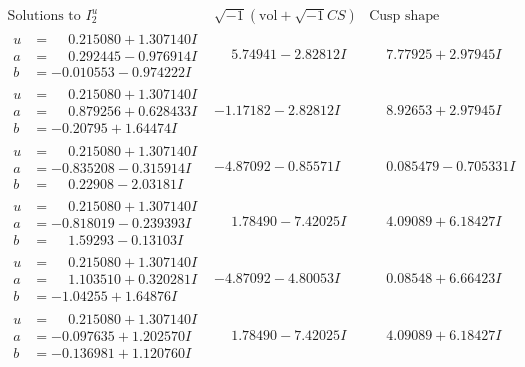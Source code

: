 \documentclass[1p]{elsarticle_modified}
\theoremstyle{definition}
\newcommand{\I}{\sqrt{-1}}
\begin{document}
$$\begin{array}{c|c|c}  
\text{Solutions to }I^u_{2}& \I (\text{vol} + \sqrt{-1}CS) & \text{Cusp shape}\\
 \hline 
\begin{aligned}
u &= \phantom{-}0.215080 + 1.307140 I \\
a &= \phantom{-}0.292445 - 0.976914 I \\
b &= -0.010553 - 0.974222 I\end{aligned}
 & \phantom{-}5.74941 - 2.82812 I & \phantom{-}7.77925 + 2.97945 I \\ \hline\begin{aligned}
u &= \phantom{-}0.215080 + 1.307140 I \\
a &= \phantom{-}0.879256 + 0.628433 I \\
b &= -0.20795 + 1.64474 I\end{aligned}
 & -1.17182 - 2.82812 I & \phantom{-}8.92653 + 2.97945 I \\ \hline\begin{aligned}
u &= \phantom{-}0.215080 + 1.307140 I \\
a &= -0.835208 - 0.315914 I \\
b &= \phantom{-}0.22908 - 2.03181 I\end{aligned}
 & -4.87092 - 0.85571 I & \phantom{-}0.085479 - 0.705331 I \\ \hline\begin{aligned}
u &= \phantom{-}0.215080 + 1.307140 I \\
a &= -0.818019 - 0.239393 I \\
b &= \phantom{-}1.59293 - 0.13103 I\end{aligned}
 & \phantom{-}1.78490 - 7.42025 I & \phantom{-}4.09089 + 6.18427 I \\ \hline\begin{aligned}
u &= \phantom{-}0.215080 + 1.307140 I \\
a &= \phantom{-}1.103510 + 0.320281 I \\
b &= -1.04255 + 1.64876 I\end{aligned}
 & -4.87092 - 4.80053 I & \phantom{-}0.08548 + 6.66423 I \\ \hline\begin{aligned}
u &= \phantom{-}0.215080 + 1.307140 I \\
a &= -0.097635 + 1.202570 I \\
b &= -0.136981 + 1.120760 I\end{aligned}
 & \phantom{-}1.78490 - 7.42025 I & \phantom{-}4.09089 + 6.18427 I \\ \hline\begin{aligned}

\end{aligned}
\end{array}$$
\end{document}
